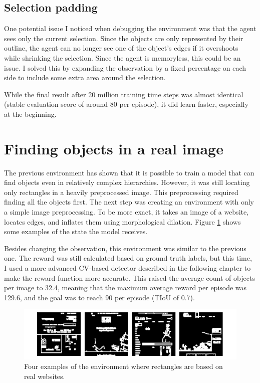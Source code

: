 \documentclass[
  digital,     %
  oneside,     %
  nosansbold,  %
  nocolorbold, %
  lof,         %
  lot,         %
]{fithesis4}
\begin{document}
\subsection{Selection padding}

One potential issue I noticed when debugging the environment was that the agent sees only the current selection. Since the objects are only represented by their outline, the agent can no longer see one of the object's edges if it overshoots while shrinking the selection. Since the agent is memoryless, this could be an issue. I solved this by expanding the observation by a fixed percentage on each side to include some extra area around the selection.

While the final result after 20 million training time steps was almost identical (stable evaluation score of around 80 per episode), it did learn faster, especially at the beginning.

\section{Finding objects in a real image}

The previous environment has shown that it is possible to train a model that can find objects even in relatively complex hierarchies. However, it was still locating only rectangles in a heavily preprocessed image. This preprocessing required finding all the objects first. The next step was creating an environment with only a simple image preprocessing. To be more exact, it takes an image of a website, locates edges, and inflates them using morphological dilation. Figure \ref{fig:env9} shows some examples of the state the model receives.

Besides changing the observation, this environment was similar to the previous one. The reward was still calculated based on ground truth labels, but this time, I used a more advanced CV-based detector described in the following chapter to make the reward function more accurate. This raised the average count of objects per image to 32.4, meaning that the maximum average reward per episode was 129.6, and the goal was to reach 90 per episode (TIoU of 0.7).

\begin{figure}
    \centering
    \includegraphics[width=1\linewidth]{env_examples/env9.pdf}
    \caption{Four examples of the environment where rectangles are based on real websites.}
    \label{fig:env9}
\end{figure}
\end{document}
